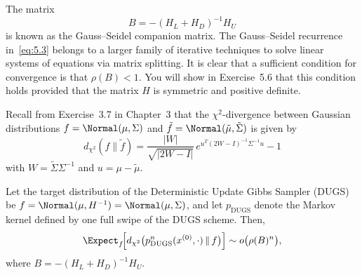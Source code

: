 The matrix
\[
  B = -(H_L + H_D)^{-1} H_U
\]
is known as the Gauss--Seidel companion matrix. The Gauss--Seidel recurrence in~\eqref{eq:5.3}
belongs to a larger family of iterative techniques to solve linear systems of equations via
matrix splitting. It is clear that a sufficient condition for convergence is that $\rho(B) < 1$.
You will show in Exercise~5.6 that this condition holds provided that the matrix $H$ is
symmetric and positive definite.

Recall from Exercise~3.7 in Chapter~3 that the $\chi^2$-divergence between Gaussian
distributions $f = \Normal(\mu, \Sigma)$ and $\tilde{f} = \Normal(\tilde{\mu}, \tilde{\Sigma})$
is given by
\begin{equation}
  d_{\chi^2}(f \| \tilde{f})
  = \frac{|W|}{\sqrt{|2W - I|}}\,e^{u^T(2W-I)^{-1}\Sigma^{-1}u} - 1
  \label{eq:5.4}
\end{equation}
with $W = \tilde{\Sigma}\Sigma^{-1}$ and $u = \mu - \tilde{\mu}$.

\begin{theorem}
\label{thm:5.12}
Let the target distribution of the Deterministic Update Gibbs Sampler (DUGS) be
$f = \Normal(\mu, H^{-1}) = \Normal(\mu, \Sigma)$, and let $p_{\mathrm{DUGS}}$ denote the
Markov kernel defined by one full swipe of the DUGS scheme. Then,
\[
  \Expect_f\!\Bigl[d_{\chi^2}\bigl(p_{\mathrm{DUGS}}^n(x^{(0)}, \cdot)\,\|\, f\bigr)\Bigr]
  \sim o\bigl(\rho(B)^n\bigr),
\]
where $B = -(H_L + H_D)^{-1}H_U$.
\end{theorem}

